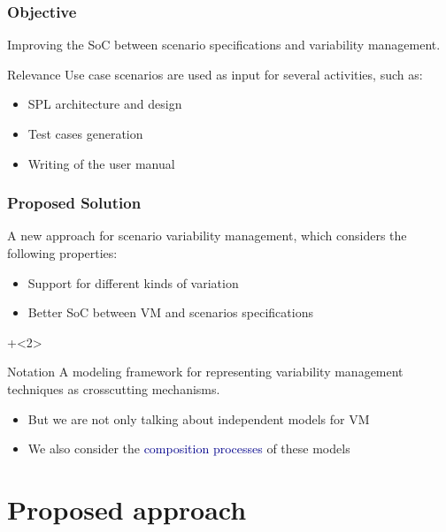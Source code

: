 \documentclass[xcolor=svgnames]{beamer}
\begin{document}
\begin{frame}
\frametitle{Objective}

Improving the SoC between scenario specifications and variability management. 

\begin{block}{Relevance}
Use case scenarios are used as input for several activities, such as:
\begin{itemize}
\item SPL architecture and design
\item Test cases generation
\item Writing of the user manual 
\end{itemize}
\end{block}
\end{frame}

\begin{frame}
\frametitle{Proposed Solution}
A new approach for scenario variability management, which considers the 
following properties:

\begin{itemize}
  \item Support for different kinds of variation
  \item Better SoC between VM and scenarios specifications 
\end{itemize}

\onslide+<2>
\begin{block}{Notation}
A modeling framework for representing variability management techniques as
crosscutting mechanisms.
\begin{itemize}
  \item But we are not only talking about independent models for VM
  \item We also consider the \textcolor{DarkBlue}{composition processes}
  of these models
\end{itemize}
\end{block}
\end{frame}

\section{Proposed approach}
\end{document}
